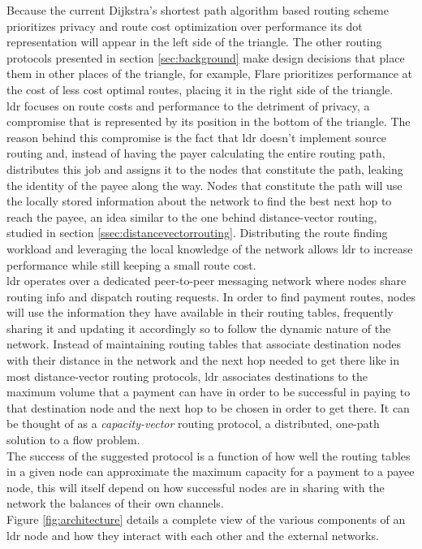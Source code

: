 Because the current Dijkstra's shortest path algorithm based routing scheme prioritizes privacy and route cost optimization over performance its dot representation will appear in the left side of the triangle. The other routing protocols presented in section \ref{sec:background} make design decisions that place them in other places of the triangle, for example, Flare prioritizes performance at the cost of less cost optimal routes, placing it in the right side of the triangle. \\
\acrshort{ldr} focuses on route costs and performance to the detriment of privacy, a compromise that is represented by its position in the bottom of the triangle. The reason behind this compromise is the fact that \acrshort{ldr} doesn't implement source routing and, instead of having the payer calculating the entire routing path, distributes this job and assigns it to the nodes that constitute the path, leaking the identity of the payee along the way. Nodes that constitute the path will use the locally stored information about the network to find the best next hop to reach the payee, an idea similar to the one behind distance-vector routing, studied in section \ref{ssec:distancevectorrouting}. Distributing the route finding workload and leveraging the local knowledge of the network allows \acrshort{ldr} to increase performance while still keeping a small route cost. \\
\acrshort{ldr} operates over a dedicated peer-to-peer messaging network where nodes share routing info and dispatch routing requests. In order to find payment routes, nodes will use the information they have available in their routing tables, frequently sharing it and updating it accordingly so to follow the dynamic nature of the network. Instead of maintaining routing tables that associate destination nodes with their distance in the network and the next hop needed to get there like in most distance-vector routing protocols, \acrshort{ldr} associates destinations to the maximum volume that a payment can have in order to be successful in paying to that destination node and the next hop to be chosen in order to get there. It can be thought of as a \textit{capacity-vector} routing protocol, a distributed, one-path solution to a flow problem. \\
The success of the suggested protocol is a function of how well the routing tables in a given node can approximate the maximum capacity for a payment to a payee node, this will itself depend on how successful nodes are in sharing with the network the balances of their own channels. \\
Figure \ref{fig:architecture} details a complete view of the various components of an \acrshort{ldr} node and how they interact with each other and the external networks.

